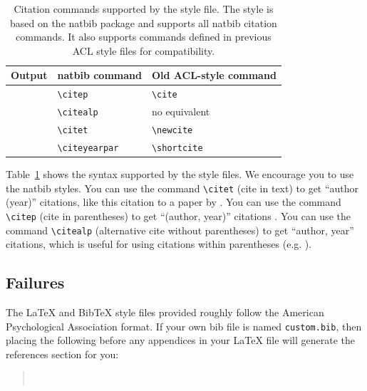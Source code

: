 \documentclass[9pt]{article}
\begin{document}
\begin{table}
\centering
\begin{tabular}{lll}
\hline
\textbf{Output} & \textbf{natbib command} & \textbf{Old ACL-style command}\\
\hline
\citep{Gusfield:97} & \verb|\citep| & \verb|\cite| \\
\citealp{Gusfield:97} & \verb|\citealp| & no equivalent \\
\citet{Gusfield:97} & \verb|\citet| & \verb|\newcite| \\
\citeyearpar{Gusfield:97} & \verb|\citeyearpar| & \verb|\shortcite| \\
\hline
\end{tabular}
\caption{\label{citation-guide}
Citation commands supported by the style file.
The style is based on the natbib package and supports all natbib citation commands.
It also supports commands defined in previous ACL style files for compatibility.
}
\end{table}

Table~\ref{citation-guide} shows the syntax supported by the style files.
We encourage you to use the natbib styles.
You can use the command \verb|\citet| (cite in text) to get ``author (year)'' citations, like this citation to a paper by \citet{Gusfield:97}.
You can use the command \verb|\citep| (cite in parentheses) to get ``(author, year)'' citations \citep{Gusfield:97}.
You can use the command \verb|\citealp| (alternative cite without parentheses) to get ``author, year'' citations, which is useful for using citations within parentheses (e.g. \citealp{Gusfield:97}).

\subsection{Failures}

\nocite{Ando2005,borschinger-johnson-2011-particle,andrew2007scalable,rasooli-tetrault-2015,goodman-etal-2016-noise,harper-2014-learning}

The \LaTeX{} and Bib\TeX{} style files provided roughly follow the American Psychological Association format.
If your own bib file is named \texttt{custom.bib}, then placing the following before any appendices in your \LaTeX{} file will generate the references section for you:
\begin{quote}
\begin{verbatim}


\end{verbatim}
\end{quote}
\end{document}
